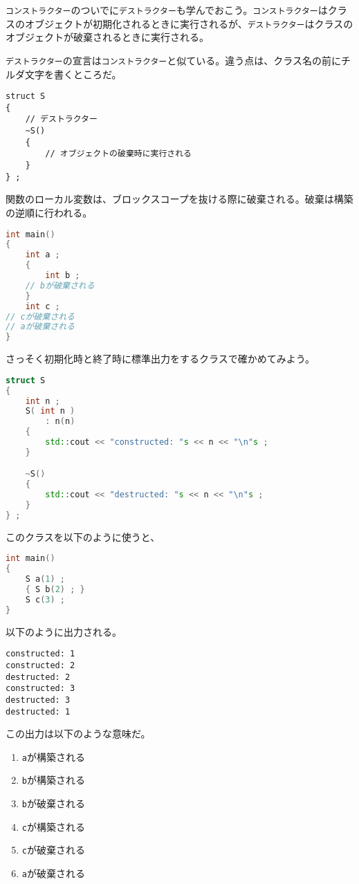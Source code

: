 \texttt{コンストラクター}のついでに\texttt{デストラクター}も学んでおこう。\texttt{コンストラクター}はクラスのオブジェクトが初期化されるときに実行されるが、\texttt{デストラクター}はクラスのオブジェクトが破棄されるときに実行される。

\texttt{デストラクター}の宣言は\texttt{コンストラクター}と似ている。違う点は、クラス名の前にチルダ文字を書くところだ。

\begin{lstlisting}[style=grammar]
struct S
{
    // デストラクター
    ~S()
    {
        // オブジェクトの破棄時に実行される
    }
} ;
\end{lstlisting}

関数のローカル変数は、ブロックスコープを抜ける際に破棄される。破棄は構築の逆順に行われる。

\begin{lstlisting}[language={C++}]
int main()
{
    int a ;
    {
        int b ;
    // bが破棄される
    }
    int c ;
// cが破棄される
// aが破棄される
}
\end{lstlisting}

さっそく初期化時と終了時に標準出力をするクラスで確かめてみよう。

\begin{lstlisting}[language={C++}]
struct S
{
    int n ;
    S( int n )
        : n(n)
    {
        std::cout << "constructed: "s << n << "\n"s ;
    }

    ~S()
    {
        std::cout << "destructed: "s << n << "\n"s ;
    }
} ;
\end{lstlisting}

このクラスを以下のように使うと、
\begin{lstlisting}[language={C++}]
int main()
{
    S a(1) ;
    { S b(2) ; }
    S c(3) ;
}
\end{lstlisting}
以下のように出力される。
\begin{lstlisting}[style=terminal]
constructed: 1
constructed: 2
destructed: 2
constructed: 3
destructed: 3
destructed: 1
\end{lstlisting}

この出力は以下のような意味だ。

\begin{enumerate}
\def\labelenumi{\arabic{enumi}.}
\item
  \texttt{a}が構築される
\item
  \texttt{b}が構築される
\item
  \texttt{b}が破棄される
\item
  \texttt{c}が構築される
\item
  \texttt{c}が破棄される
\item
  \texttt{a}が破棄される
\end{enumerate}

